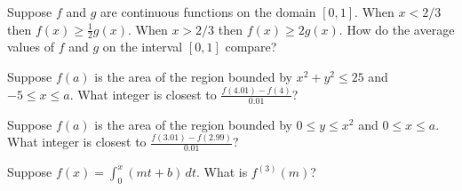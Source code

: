 \documentclass{ximera}
\newcommand{\recommendation}[1]{}
\begin{document}
\begin{shuffle}
\begin{problem}
  Suppose $f$ and $g$ are continuous functions on the domain $[0,1]$.  When $x < 2/3$ then $f(x) \geq \frac{1}{2} g(x)$.  When $x > 2/3$ then $f(x) \geq 2 g(x)$.  How do the average values of $f$ and $g$ on the interval $[0,1]$ compare?
  \begin{multipleChoice}
  \end{multipleChoice}
\end{problem}



\begin{problem}
  Suppose $f(a)$ is the area of the region bounded by $x^2 + y^2 \leq 25$ and $-5 \leq x \leq a$.  What integer is closest to $\frac{f(4.01) - f(4)}{0.01}$?
  \begin{multipleChoice}
  \end{multipleChoice}
\end{problem}

\begin{problem}
  Suppose $f(a)$ is the area of the region bounded by $0 \leq y \leq x^2$ and $0 \leq x \leq a$.  What integer is closest to $\frac{f(3.01) - f(2.99)}{0.01}$?
  \begin{multipleChoice}
  \end{multipleChoice}
\end{problem}

\begin{problem}
  Suppose $f(x) = \int_0^x \left( mt + b \right) \, dt$.  What is $f^{(3)}(m)$?
  \begin{multipleChoice}
  \end{multipleChoice}
\end{problem}


\end{shuffle}
\end{document}

